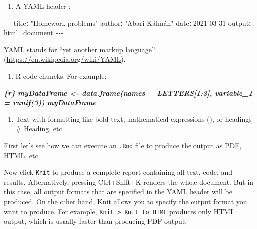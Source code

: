 \documentclass[
]{book}
\newenvironment{Shaded}{\begin{snugshade}}{\end{snugshade}}
\newcommand{\AttributeTok}[1]{\textcolor[rgb]{0.77,0.63,0.00}{#1}}
\newcommand{\FunctionTok}[1]{\textcolor[rgb]{0.00,0.00,0.00}{#1}}
\newcommand{\InformationTok}[1]{\textcolor[rgb]{0.56,0.35,0.01}{\textbf{\textit{#1}}}}
\newcommand{\KeywordTok}[1]{\textcolor[rgb]{0.13,0.29,0.53}{\textbf{#1}}}
\newcommand{\PreprocessorTok}[1]{\textcolor[rgb]{0.56,0.35,0.01}{\textit{#1}}}
\newcommand{\StringTok}[1]{\textcolor[rgb]{0.31,0.60,0.02}{#1}}
\providecommand{\tightlist}{%
  \setlength{\itemsep}{0pt}\setlength{\parskip}{0pt}}
\begin{document}
\begin{enumerate}
\def\labelenumi{\arabic{enumi}.}
\tightlist
\item
  A YAML header :
\end{enumerate}

\begin{Shaded}
\begin{Highlighting}[]
\PreprocessorTok{{-}{-}{-}}
\FunctionTok{title}\KeywordTok{:}\AttributeTok{ }\StringTok{"Homework problems"}
\FunctionTok{author}\KeywordTok{:}\AttributeTok{ }\StringTok{"Abari Kálmán"}
\FunctionTok{date}\KeywordTok{:}\AttributeTok{ }\StringTok{\textquotesingle{}2021 03 31 \textquotesingle{}}
\FunctionTok{output}\KeywordTok{:}\AttributeTok{ html\_document}
\PreprocessorTok{{-}{-}{-}}
\end{Highlighting}
\end{Shaded}

YAML stands for ``yet another markup language''
(\url{https://en.wikipedia.org/wiki/YAML}).

\begin{enumerate}
\def\labelenumi{\arabic{enumi}.}
\setcounter{enumi}{1}
\tightlist
\item
  R code chuncks. For example:
\end{enumerate}

\begin{Shaded}
\begin{Highlighting}[]
\InformationTok{\textasciigrave{}\textasciigrave{}\textasciigrave{}\{r\}}
\InformationTok{myDataFrame \textless{}{-} data.frame(names = LETTERS[1:3], variable\_1 = runif(3))}
\InformationTok{myDataFrame}
\InformationTok{\textasciigrave{}\textasciigrave{}\textasciigrave{}}
\end{Highlighting}
\end{Shaded}

\begin{enumerate}
\def\labelenumi{\arabic{enumi}.}
\setcounter{enumi}{2}
\tightlist
\item
  Text with formatting like bold text, mathematical expressions (), or
  headings \# Heading, etc.
\end{enumerate}

First let's see how we can execute an \texttt{.Rmd} file to produce the output
as PDF, HTML, etc.

Now click \texttt{Knit} to produce a complete report containing all text, code,
and results. Alternatively, pressing Ctrl+Shift+K renders the
whole document. But in this case, all output formats that are specified
in the YAML header will be produced. On the other hand, Knit allows you
to specify the output format you want to produce. For example,
\texttt{Knit\ \textgreater{}\ Knit\ to\ HTML} produces only HTML output, which is usually faster
than producing PDF output.
\end{document}
